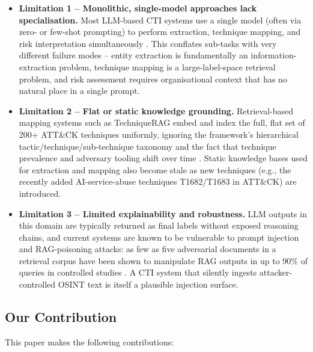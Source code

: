 \documentclass[runningheads]{llncs}
\begin{document}
\begin{itemize}
    \item \textbf{Limitation 1 -- Monolithic, single-model approaches lack specialisation.} Most LLM-based CTI systems use a single model (often via zero- or few-shot prompting) to perform extraction, technique mapping, and risk interpretation simultaneously \cite{fayyazi2024,ctibench2024}. This conflates sub-tasks with very different failure modes -- entity extraction is fundamentally an information-extraction problem, technique mapping is a large-label-space retrieval problem, and risk assessment requires organisational context that has no natural place in a single prompt.
    \item \textbf{Limitation 2 -- Flat or static knowledge grounding.} Retrieval-based mapping systems such as TechniqueRAG embed and index the full, flat set of 200+ ATT\&CK techniques uniformly, ignoring the framework's hierarchical tactic/technique/sub-technique taxonomy and the fact that technique prevalence and adversary tooling shift over time \cite{hierrag2026}. Static knowledge bases used for extraction and mapping also become stale as new techniques (e.g., the recently added AI-service-abuse techniques T1682/T1683 in ATT\&CK) are introduced.
    \item \textbf{Limitation 3 -- Limited explainability and robustness.} LLM outputs in this domain are typically returned as final labels without exposed reasoning chains, and current systems are known to be vulnerable to prompt injection and RAG-poisoning attacks: as few as five adversarial documents in a retrieval corpus have been shown to manipulate RAG outputs in up to 90\% of queries in controlled studies \cite{poisonedrag2025,promptinjectionreview2026}. A CTI system that silently ingests attacker-controlled OSINT text is itself a plausible injection surface.
\end{itemize}

\subsection{Our Contribution}

This paper makes the following contributions:
\end{document}
